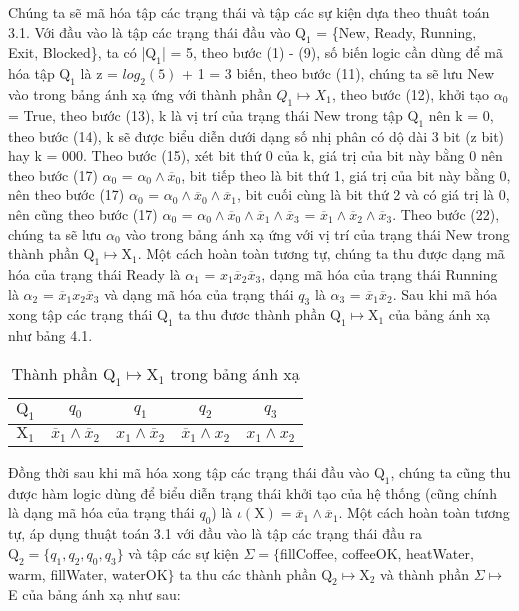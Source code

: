 \documentclass[a4paper,13pt,oneside,openany]{book}
\begin{document}
\begin{flushleft}
	Chúng ta sẽ mã hóa tập các trạng thái và tập các sự kiện dựa theo thuât toán 3.1. Với đầu vào là tập các trạng thái đầu vào $\textrm{Q}_1$ = \{New, Ready, Running,\\Exit, Blocked\}, ta có |$\textrm{Q}_1$| = 5, theo bước (1) - (9), số biến logic cần dùng để mã hóa tập $\textrm{Q}_1$ là z = $log_2(5)$ + 1 = 3 biến, theo bước (11), chúng ta sẽ lưu New vào trong bảng ánh xạ ứng với thành phần $Q_1 \mapsto X_1$, theo bước (12), khởi tạo $\alpha_0$ = True, theo bước (13), k là vị trí của trạng thái New trong tập $\textrm{Q}_1$ nên k = 0, theo bước (14), k sẽ được biểu diễn dưới dạng số nhị phân có dộ dài 3 bit (z bit) hay k = 000. Theo bước (15), xét bit thứ 0 của k, giá trị của bit này bằng 0 nên theo bước (17) $\alpha_0$ = $\alpha_0 \land \overline{x}_0$, bit tiếp theo là bit thứ 1, giá trị của bit này bằng 0, nên theo bước (17) $\alpha_0$ = $\alpha_0 \land \overline{x}_0 \land \overline{x}_1$, bit cuối cùng là bit thứ 2 và có giá trị là 0, nên cũng theo bước (17) $\alpha_0$ = $\alpha_0 \land \overline{x}_0 \land \overline{x}_1 \land \overline{x}_3$ = $\overline{x}_1 \land \overline{x}_2 \land \overline{x}_3$. Theo bước (22), chúng ta sẽ lưu $\alpha_0$ vào trong bảng ánh xạ ứng với vị trí của trạng thái New trong thành phần $\textrm{Q}_1 \mapsto \textrm{X}_1$. Một cách hoàn toàn tương tự, chúng ta thu được dạng mã hóa của trạng thái Ready là $\alpha_1$ = $x_1\overline{x}_2\overline{x}_3$, dạng mã hóa của trạng thái Running là $\alpha_2$ = $\overline{x}_1x_2\overline{x}_3$ và dạng mã hóa của trạng thái $q_3$ là $\alpha_3$ = $\overline{x}_1\overline{x}_2$. Sau khi mã hóa xong tập các trạng thái $\textrm{Q}_1$ ta thu đươc thành phần $\textrm{Q}_1 \mapsto \textrm{X}_1$ của bảng ánh xạ như bảng 4.1.
	\begin{table}[!ht]
		\centering
		\renewcommand{\arraystretch}{1.25}
		\begin{tabular}{|c|c|c|c|c|}
			\hline
			$\textrm{Q}_1$ & $q_0$ & $q_1$ & $q_2$ & $q_3$\\
			\hline
			$\textrm{X}_1$ & $\overline{x}_1 \land \overline{x}_2$ & $x_1\land\overline{x}_2$&$\overline{x}_1\land x_2$ &
			$x_1 \land x_2$\\
			\hline
		\end{tabular}
		\caption{Thành phần $\textrm{Q}_1 \mapsto \textrm{X}_1$ trong bảng ánh xạ}
	\end{table}
	\noindent
	Đồng thời sau khi mã hóa xong tập các trạng thái đầu vào $\textrm{Q}_1$, chúng ta cũng thu được hàm logic dùng để biểu diễn trạng thái khởi tạo của hệ thống (cũng chính là dạng mã hóa của trạng thái $q_0$) là $\iota(\textrm{X}) = \overline{x}_1 \land \overline{x}_1$. Một cách hoàn toàn tương tự, áp dụng thuật toán 3.1 với đầu vào là tập các trạng thái đầu ra $\textrm{Q}_2 = \{q_1, q_2, q_0, q_3\}$ và tập các sự kiện $\Sigma = \{$fillCoffee, coffeeOK, heatWater, warm, fillWater, waterOK$\}$ ta thu các thành phần $\textrm{Q}_2 \mapsto \textrm{X}_2$ và thành phần $\Sigma \mapsto$ E của bảng ánh xạ như sau:
	

\end{flushleft}
\end{document}
